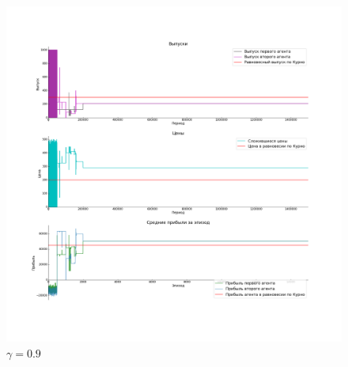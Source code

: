 \documentclass[12pt, a4paper]{extarticle}
\theoremstyle{definition}
\begin{document}
\begin{figure}[h]
    \centering
    \includegraphics[width=\textwidth,height=\textheight,keepaspectratio]{gamma_9.png}
    \caption{$\gamma = 0.9$}
    \label{fig:gamma9}
\end{figure}
\end{document}

